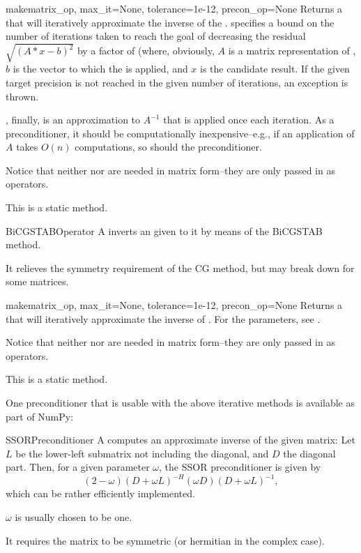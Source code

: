 \begin{methoddesc}{make}{matrix_op, max_it=None, tolerance=1e-12, precon_op=None}
  Returns a  that will iteratively approximate the
  inverse of the  . 
  specifies a bound on the number of iterations taken to reach the
  goal of decreasing the residual $\sqrt{(A*x-b)^2}$ by a factor of
   (where, obviously, $A$ is a matrix representation of
  , $b$ is the vector to which the 
  is applied, and $x$ is the candidate result.  If the given target
  precision is not reached in the given number of iterations, an
  exception is thrown.

  , finally, is an approximation to $A^{-1}$ that is
  applied once each iteration. As a preconditioner, it should be
  computationally inexpensive--e.g., if an application of $A$ takes $O(n)$
  computations, so should the preconditioner.

  Notice that neither  nor  are needed
  in matrix form--they are only passed in as operators.

  This is a static method.
\end{methoddesc}
\begin{classdesc*}{BiCGSTABOperator}
  A  inverts an  given to it
  by means of the BiCGSTAB method.

  It relieves the symmetry requirement of the CG method, but may break
  down for some matrices.
\end{classdesc*}
\begin{methoddesc}{make}{matrix_op, max_it=None, tolerance=1e-12, precon_op=None}
  Returns a  that will iteratively approximate the
  inverse of . For the parameters, see .

  Notice that neither  nor  are needed
  in matrix form--they are only passed in as operators.

  This is a static method.
\end{methoddesc}
One preconditioner that is usable with the above iterative methods is
available as part of NumPy:
\begin{classdesc*}{SSORPreconditioner}
  A  computes an approximate inverse of the
  given matrix: Let $L$ be the lower-left submatrix not including the
  diagonal, and $D$ the diagonal part. Then, for a given parameter
  $\omega$, the SSOR preconditioner is given by 
  \[
  (2-\omega)(D+\omega L)^{-H}(\omega D)(D+\omega L)^{-1},
  \]
  which can be rather efficiently implemented.

  $\omega$ is usually chosen to be one.

  It requires the matrix to be symmetric (or hermitian in the complex
  case).
\end{classdesc*}
